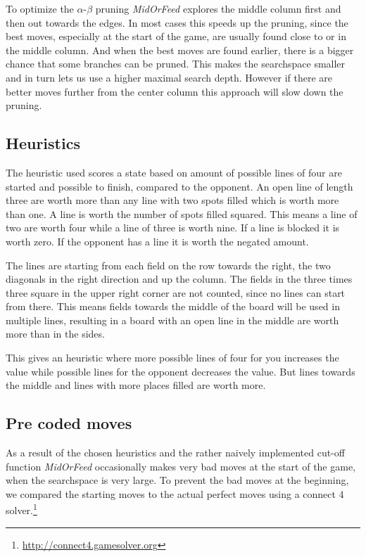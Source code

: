 To optimize the $\alpha$-$\beta$ pruning \textit{MidOrFeed} explores the middle column first and then out towards the edges. In most cases this speeds up the pruning, since the best moves, especially at the start of the game, are usually found close to or in the middle column. And when the best moves are found earlier, there is a bigger chance that some branches can be pruned. This makes the searchspace smaller and in turn lets us use a higher maximal search depth. However if there are better moves further from the center column this approach will slow down the pruning.

\subsection{Heuristics}
The heuristic used scores a state based on amount of possible lines of four are started and possible to finish, compared to the opponent. An open line of length three are worth more than any line with two spots filled which is worth more than one. A line is worth the number of spots filled squared. This means a line of two are worth four while a line of three is worth nine. If a line is blocked it is worth zero. If the opponent has a line it is worth the negated amount.

The lines are starting from each field on the row towards the right, the two diagonals in the right direction and up the column. The fields in the three times three square in the upper right corner are not counted, since no lines can start from there. This means fields towards the middle of the board will be used in multiple lines, resulting in a board with an open line in the middle are worth more than in the sides.

This gives an heuristic where more possible lines of four for you increases the value while possible lines for the opponent decreases the value. But lines towards the middle and lines with more places filled are worth more.

\subsection{Pre coded moves}
As a result of the chosen heuristics and the rather naively implemented cut-off function \textit{MidOrFeed} occasionally makes very bad moves at the start of the game, when the searchspace is very large. To prevent the bad moves at the beginning, we compared the starting moves to the actual perfect moves using a connect 4 solver.\footnote{\url{http://connect4.gamesolver.org}}

